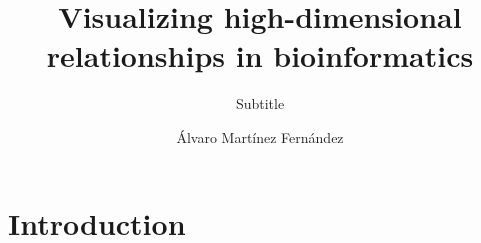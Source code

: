 \documentclass[USenglish]{uit-thesis}
\begin{document}

\title{Visualizing high-dimensional relationships in bioinformatics}
\subtitle{Subtitle}%
\author{\'Alvaro Mart\'inez Fern\'andez}

\maketitle

\frontmatter

\iffalse
\begin{dedication}
To...

Thanks for...
\end{dedication}


\begin{epigraph}
\epigraphitem{Simplicity is prerequisite for reliability.}{Edsger Dijkstra}
\epigraphitem{Beware of bugs in the above code;\\I have only proved it correct, not tried it.}{Donald Knuth}
\end{epigraph}

\begin{abstract}
This is the abstract, blah blah blah.
\end{abstract}

\begin{acknowledgement}
Thank you for blah blah blah
\end{acknowledgement}
\fi

\tableofcontents

\mainmatter

\chapter{Introduction}


\printbibliography

\backmatter
\end{document}
